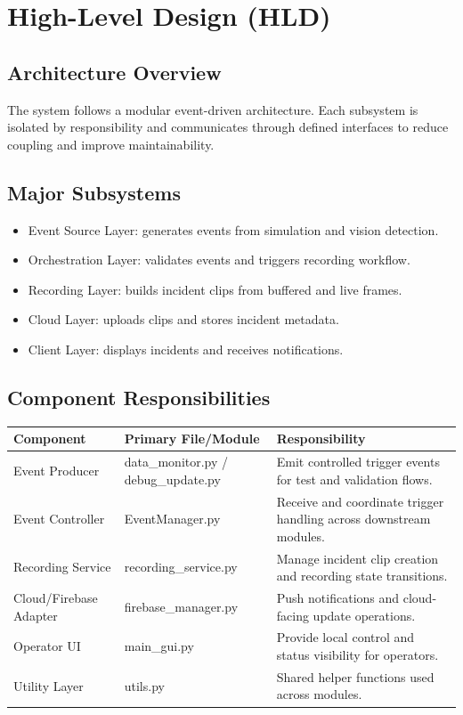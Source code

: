 \chapter{High-Level Design (HLD)}
\section{Architecture Overview}
The system follows a modular event-driven architecture. Each subsystem is isolated by responsibility and communicates through defined interfaces to reduce coupling and improve maintainability.

\section{Major Subsystems}
\begin{itemize}
\item Event Source Layer: generates events from simulation and vision detection.
\item Orchestration Layer: validates events and triggers recording workflow.
\item Recording Layer: builds incident clips from buffered and live frames.
\item Cloud Layer: uploads clips and stores incident metadata.
\item Client Layer: displays incidents and receives notifications.
\end{itemize}

\section{Component Responsibilities}
\begin{longtable}{|p{3.2cm}|p{3.0cm}|p{7.8cm}|}
\hline
\textbf{Component} & \textbf{Primary File/Module} & \textbf{Responsibility} \\
\hline
Event Producer & data\_monitor.py / debug\_update.py & Emit controlled trigger events for test and validation flows. \\
\hline
Event Controller & EventManager.py & Receive and coordinate trigger handling across downstream modules. \\
\hline
Recording Service & recording\_service.py & Manage incident clip creation and recording state transitions. \\
\hline
Cloud/Firebase Adapter & firebase\_manager.py & Push notifications and cloud-facing update operations. \\
\hline
Operator UI & main\_gui.py & Provide local control and status visibility for operators. \\
\hline
Utility Layer & utils.py & Shared helper functions used across modules. \\
\hline
\end{longtable}

